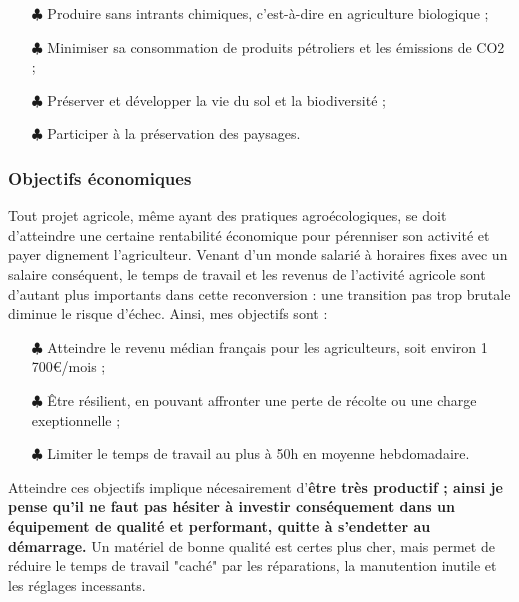 \documentclass{book}
\begin{document}
\hspace{1cm}
\begin{itemize}

	\item[$\clubsuit$] Produire sans intrants chimiques, c'est-à-dire en agriculture biologique ;
	\item[$\clubsuit$] Minimiser sa consommation de produits pétroliers et les émissions de CO2 ;
	\item[$\clubsuit$] Préserver et développer la vie du sol et la biodiversité ;
	
	\item[$\clubsuit$] Participer à la préservation des paysages.

\end{itemize}
\hspace{1cm}

\subsubsection{Objectifs économiques}

Tout projet agricole, même ayant des pratiques agroécologiques, se doit d'atteindre une certaine rentabilité économique pour pérenniser son activité et payer dignement l'agriculteur. Venant d’un monde salarié à horaires fixes avec un salaire conséquent, le temps de travail et les revenus de l'activité agricole sont d'autant plus importants dans cette reconversion : une transition pas trop brutale diminue le risque d’échec. Ainsi, mes objectifs sont :

\hspace{1cm}
\begin{itemize}

	\item[$\clubsuit$] Atteindre le revenu médian français pour les agriculteurs, soit environ 1 700\euro{}/mois ; 
	\item[$\clubsuit$] Être résilient, en pouvant affronter une perte de récolte ou une charge exeptionnelle ;
	\item[$\clubsuit$] Limiter le temps de travail au plus à 50h en moyenne hebdomadaire.

\end{itemize}
\hspace{1cm}

Atteindre ces objectifs implique nécesairement d'\textbf{être très productif ; ainsi je pense qu'il ne faut pas hésiter à investir conséquement dans un équipement de qualité et performant, quitte à s'endetter au démarrage.} Un matériel de bonne qualité est certes plus cher, mais permet de réduire le temps de travail "caché" par les réparations, la manutention inutile et les réglages incessants.
\end{document}
